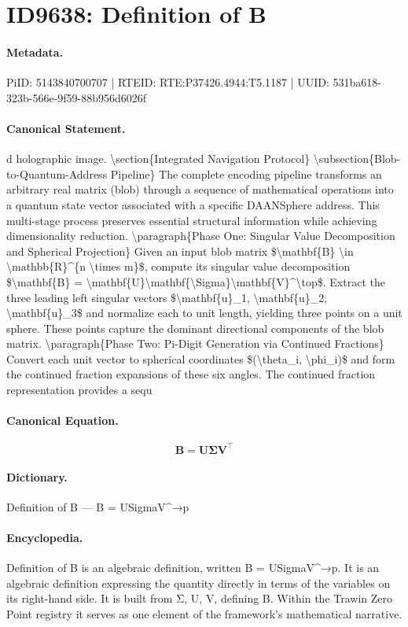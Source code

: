 \section*{ID9638: Definition of B}
\paragraph{Metadata.}
PiID: 5143840700707 | RTEID: RTE:P37426.4944:T5.1187 | UUID: 531ba618-323b-566e-9f59-88b956d6026f

\paragraph{Canonical Statement.}
d holographic image. \textbackslash{}section\{Integrated Navigation Protocol\} \textbackslash{}subsection\{Blob-to-Quantum-Address Pipeline\} The complete encoding pipeline transforms an arbitrary real matrix (blob) through a sequence of mathematical operations into a quantum state vector associated with a specific DAANSphere address. This multi-stage process preserves essential structural information while achieving dimensionality reduction. \textbackslash{}paragraph\{Phase One: Singular Value Decomposition and Spherical Projection\} Given an input blob matrix \$\textbackslash{}mathbf\{B\} \textbackslash{}in \textbackslash{}mathbb\{R\}\textasciicircum{}\{n \textbackslash{}times m\}\$, compute its singular value decomposition \$\textbackslash{}mathbf\{B\} = \textbackslash{}mathbf\{U\}\textbackslash{}mathbf\{\textbackslash{}Sigma\}\textbackslash{}mathbf\{V\}\textasciicircum{}\textbackslash{}top\$. Extract the three leading left singular vectors \$\textbackslash{}mathbf\{u\}\_1, \textbackslash{}mathbf\{u\}\_2, \textbackslash{}mathbf\{u\}\_3\$ and normalize each to unit length, yielding three points on a unit sphere. These points capture the dominant directional components of the blob matrix. \textbackslash{}paragraph\{Phase Two: Pi-Digit Generation via Continued Fractions\} Convert each unit vector to spherical coordinates \$(\textbackslash{}theta\_i, \textbackslash{}phi\_i)\$ and form the continued fraction expansions of these six angles. The continued fraction representation provides a sequ

\paragraph{Canonical Equation.}
\[
\mathbf{B} = \mathbf{U}\mathbf{\Sigma}\mathbf{V}^\top
\]

\paragraph{Dictionary.}
Definition of B — B = USigmaV\textasciicircum{}→p

\paragraph{Encyclopedia.}
Definition of B is an algebraic definition, written B = USigmaV\textasciicircum{}→p. It is an algebraic definition expressing the quantity directly in terms of the variables on its right-hand side. It is built from Σ, U, V, defining B. Within the Trawin Zero Point registry it serves as one element of the framework's mathematical narrative.
